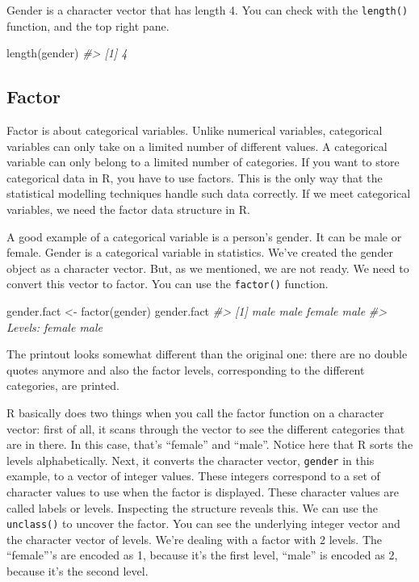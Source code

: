 \documentclass[
]{book}
\newenvironment{Shaded}{\begin{snugshade}}{\end{snugshade}}
\newcommand{\CommentTok}[1]{\textcolor[rgb]{0.56,0.35,0.01}{\textit{#1}}}
\newcommand{\FunctionTok}[1]{\textcolor[rgb]{0.00,0.00,0.00}{#1}}
\newcommand{\NormalTok}[1]{#1}
\newcommand{\OtherTok}[1]{\textcolor[rgb]{0.56,0.35,0.01}{#1}}
\begin{document}
Gender is a character vector that has length 4. You can check with the \texttt{length()} function, and the top right pane.

\begin{Shaded}
\begin{Highlighting}[]
\FunctionTok{length}\NormalTok{(gender)}
\CommentTok{\#\textgreater{} [1] 4}
\end{Highlighting}
\end{Shaded}

\hypertarget{factor}{%
\subsection{Factor}\label{factor}}

Factor is about categorical variables. Unlike numerical variables, categorical variables can only take on a limited number of different values. A categorical variable can only belong to a limited number of categories. If you want to store categorical data in R, you have to use factors. This is the only way that the statistical modelling techniques handle such data correctly. If we meet categorical variables, we need the factor data structure in R.

A good example of a categorical variable is a person's gender. It can be male or female. Gender is a categorical variable in statistics. We've created the gender object as a character vector. But, as we mentioned, we are not ready. We need to convert this vector to factor. You can use the \texttt{factor()} function.

\begin{Shaded}
\begin{Highlighting}[]
\NormalTok{gender.fact }\OtherTok{\textless{}{-}} \FunctionTok{factor}\NormalTok{(gender)}
\NormalTok{gender.fact}
\CommentTok{\#\textgreater{} [1] male   male   female male  }
\CommentTok{\#\textgreater{} Levels: female male}
\end{Highlighting}
\end{Shaded}

The printout looks somewhat different than the original one: there are no double quotes anymore and also the factor levels, corresponding to the different categories, are printed.

R basically does two things when you call the factor function on a character vector: first of all, it scans through the vector to see the different categories that are in there. In this case, that's ``female'' and ``male''. Notice here that R sorts the levels alphabetically. Next, it converts the character vector, \texttt{gender} in this example, to a vector of integer values. These integers correspond to a set of character values to use when the factor is displayed. These character values are called labels or levels.
Inspecting the structure reveals this. We can use the \texttt{unclass()} to uncover the factor. You can see the underlying integer vector and the character vector of levels. We're dealing with a factor with 2 levels. The ``female'''s are encoded as 1, because it's the first level, ``male'' is encoded as 2, because it's the second level.
\end{document}
